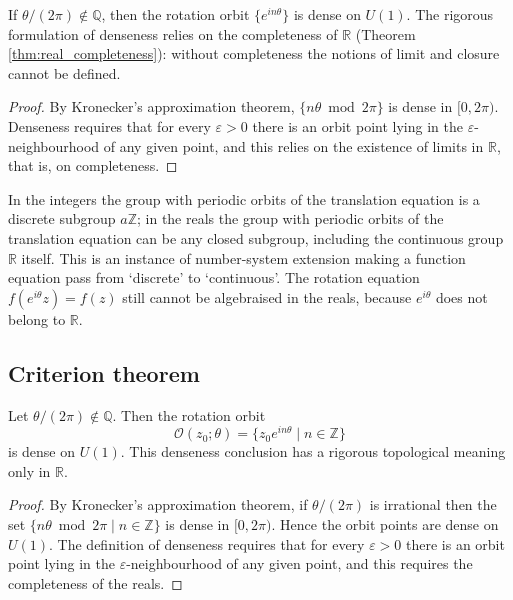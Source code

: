 \begin{proposition}\label{prop:quasi_period_R}
If $\theta/(2\pi)\notin\mathbb{Q}$, then the rotation orbit $\{e^{in\theta}\}$ is dense on $U(1)$. The rigorous formulation of denseness relies on the completeness of $\mathbb{R}$ (Theorem \ref{thm:real_completeness}): without completeness the notions of limit and closure cannot be defined.
\end{proposition}

\begin{proof}
By Kronecker's approximation theorem, $\{n\theta\bmod 2\pi\}$ is dense in $[0,2\pi)$. Denseness requires that for every $\varepsilon>0$ there is an orbit point lying in the $\varepsilon$-neighbourhood of any given point, and this relies on the existence of limits in $\mathbb{R}$, that is, on completeness.
\end{proof}

\begin{remark}\label{rem:real_makes_translation_continuous}
In the integers the group with periodic orbits of the translation equation is a discrete subgroup $a\mathbb{Z}$; in the reals the group with periodic orbits of the translation equation can be any closed subgroup, including the continuous group $\mathbb{R}$ itself. This is an instance of number-system extension making a function equation pass from `discrete' to `continuous'. The rotation equation $f(e^{i\theta}z)=f(z)$ still cannot be algebraised in the reals, because $e^{i\theta}$ does not belong to $\mathbb{R}$.
\end{remark}

\subsection{\texorpdfstring{Criterion theorem}{Criterion theorem}}

\begin{theorem}\label{thm:real_quasi_period_criterion}
Let $\theta/(2\pi) \notin \mathbb{Q}$. Then the rotation orbit
\[
\mathcal{O}(z_0;\theta) = \{z_0 e^{in\theta} \mid n\in\mathbb{Z}\}
\]
is dense on $U(1)$. This denseness conclusion has a rigorous topological meaning only in $\mathbb{R}$.
\end{theorem}

\begin{proof}
By Kronecker's approximation theorem, if $\theta/(2\pi)$ is irrational then the set $\{n\theta \bmod 2\pi \mid n\in\mathbb{Z}\}$ is dense in $[0,2\pi)$. Hence the orbit points are dense on $U(1)$. The definition of denseness requires that for every $\varepsilon > 0$ there is an orbit point lying in the $\varepsilon$-neighbourhood of any given point, and this requires the completeness of the reals.
\end{proof}

